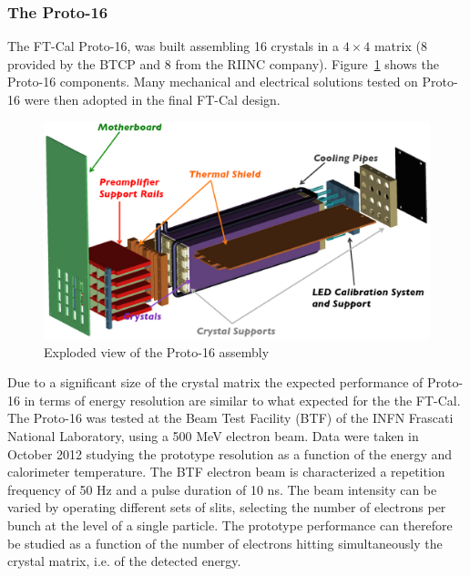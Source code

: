 \subsubsection{The Proto-16}\label{par:proto-16}
The FT-Cal Proto-16, was built assembling
16 crystals in a $4\times4$ matrix (8 provided by the BTCP and 8 from
the RIINC company).
Figure~\ref{fig:p16-whole} shows the Proto-16
components.  
Many mechanical and electrical solutions tested on Proto-16 were then adopted in the final FT-Cal design.
\begin{figure}
\includegraphics[width=1.0\columnwidth]{./fig/p16-whole.eps}
\caption{Exploded view of the Proto-16 assembly}
\label{fig:p16-whole}
\end{figure}
Due to a significant size of the  crystal matrix the expected performance of Proto-16 in terms of energy resolution are similar to what expected for the the FT-Cal. 
The Proto-16 was tested at the Beam Test Facility (BTF) \cite{btf} of
the INFN Frascati National Laboratory, using a 500 MeV electron
beam. Data were taken in  October 2012 studying  the prototype
resolution as a function of the energy and calorimeter temperature. The BTF electron beam is characterized a repetition
frequency of 50 Hz and a pulse duration of 10 ns. The beam intensity
can be varied by operating different sets of slits, selecting the
number of electrons per bunch at the level of a single particle. The
prototype performance can therefore be studied as a function of the
number of electrons hitting simultaneously the crystal matrix, i.e. of
the detected energy.


